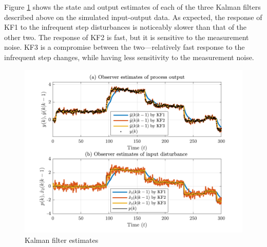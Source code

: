 Figure \ref{fig:sim-sys-siso-KF123-est} shows the state and output estimates of each of the three Kalman filters described above on the simulated input-output data. As expected, the response of KF1 to the infrequent step disturbances is noticeably slower than that of the other two. The response of KF2 is fast, but it is sensitive to the measurement noise. KF3 is a compromise between the two—relatively fast response to the infrequent step changes, while having less sensitivity to the measurement noise.
\begin{figure}[htp]
	\centering
	\includegraphics[width=14cm]{images/sim_sys_1_3_est.pdf}
	\caption{Kalman filter estimates}
	\label{fig:sim-sys-siso-KF123-est}
\end{figure}

